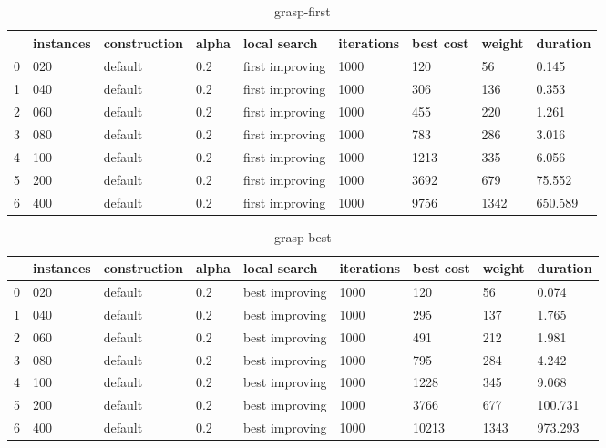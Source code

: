 \begin{table}
    \centering
    \begin{tabular}{lllllllll}
        \toprule
        {} & instances & construction & alpha & local search    & iterations & best cost & weight & duration \\
        \midrule
        0  & 020       & default      & 0.2   & first improving & 1000       & 120       & 56     & 0.145    \\
        1  & 040       & default      & 0.2   & first improving & 1000       & 306       & 136    & 0.353    \\
        2  & 060       & default      & 0.2   & first improving & 1000       & 455       & 220    & 1.261    \\
        3  & 080       & default      & 0.2   & first improving & 1000       & 783       & 286    & 3.016    \\
        4  & 100       & default      & 0.2   & first improving & 1000       & 1213      & 335    & 6.056    \\
        5  & 200       & default      & 0.2   & first improving & 1000       & 3692      & 679    & 75.552   \\
        6  & 400       & default      & 0.2   & first improving & 1000       & 9756      & 1342   & 650.589  \\
        \bottomrule
    \end{tabular}
    \caption{grasp-first}
    \label{table:grasp-first}
\end{table}

\begin{table}
    \centering
    \begin{tabular}{lllllllll}
        \toprule
        {} & instances & construction & alpha & local search   & iterations & best cost & weight & duration \\
        \midrule
        0  & 020       & default      & 0.2   & best improving & 1000       & 120       & 56     & 0.074    \\
        1  & 040       & default      & 0.2   & best improving & 1000       & 295       & 137    & 1.765    \\
        2  & 060       & default      & 0.2   & best improving & 1000       & 491       & 212    & 1.981    \\
        3  & 080       & default      & 0.2   & best improving & 1000       & 795       & 284    & 4.242    \\
        4  & 100       & default      & 0.2   & best improving & 1000       & 1228      & 345    & 9.068    \\
        5  & 200       & default      & 0.2   & best improving & 1000       & 3766      & 677    & 100.731  \\
        6  & 400       & default      & 0.2   & best improving & 1000       & 10213     & 1343   & 973.293  \\
        \bottomrule
    \end{tabular}
    \caption{grasp-best}
    \label{table:grasp-best}
\end{table}
